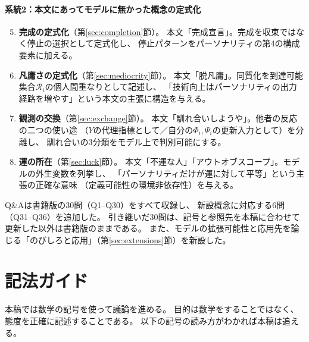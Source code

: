 \documentclass[a4paper, fontsize=10pt]{jlreq}
\newcommand{\Phii}{\Phi_i}
\newcommand{\Psii}{\Psi_i}
\newcommand{\Ri}{\mathcal{R}_i}            %
\begin{document}
\paragraph{系統2：本文にあってモデルに無かった概念の定式化}
\begin{enumerate}[leftmargin=2em]\setcounter{enumi}{4}
  \item \textbf{完成の定式化}（第\ref{sec:completion}節）。
    本文「完成宣言」。完成を収束ではなく停止の選択として定式化し、
    停止パターンをパーソナリティの第4の構成要素に加える。
  \item \textbf{凡庸さの定式化}（第\ref{sec:mediocrity}節）。
    本文「脱凡庸」。同質化を到達可能集合$\Ri$の個人間重なりとして記述し、
    「技術向上はパーソナリティの出力経路を増やす」という本文の主張に構造を与える。
  \item \textbf{観測の交換}（第\ref{sec:exchange}節）。
    本文「馴れ合いしようや」。他者の反応の二つの使い途
    （$Y$の代理指標として／自分の$\Phii, \Psii$の更新入力として）を分離し、
    馴れ合いの3分類をモデル上で判別可能にする。
  \item \textbf{運の所在}（第\ref{sec:luck}節）。
    本文「不運な人」「アウトオブスコープ」。モデルの外生変数を列挙し、
    「パーソナリティだけが運に対して平等」という主張の正確な意味
    （定義可能性の環境非依存性）を与える。
\end{enumerate}

Q\&Aは書籍版の30問（Q1--Q30）をすべて収録し、
新設概念に対応する6問（Q31--Q36）を追加した。
引き継いだ30問は、記号と参照先を本稿に合わせて更新した以外は書籍版のままである。
また、モデルの拡張可能性と応用先を論じる「のびしろと応用」（第\ref{sec:extensions}節）を新設した。

\clearpage

\section*{記法ガイド}

本稿では数学の記号を使って議論を進める。
目的は数学をすることではなく、態度を正確に記述することである。
以下の記号の読み方がわかれば本稿は追える。

\bigskip
\end{document}
